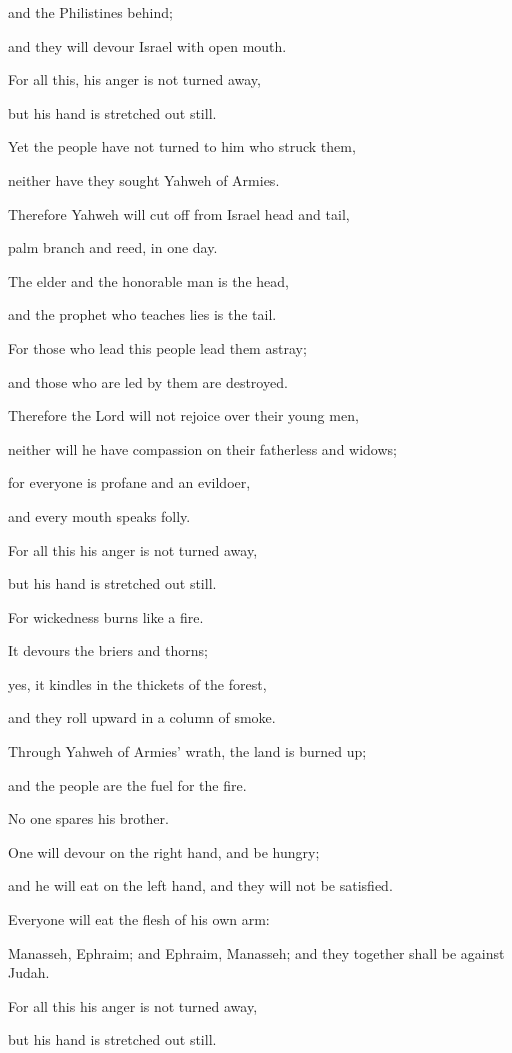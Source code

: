 {\par }{\QB and the Philistines behind;
\par }{\QB and they will devour Israel with open mouth.
\par }{\Q For all this, his anger is not turned away,
\par }{\QB but his hand is stretched out still.
\par }{\BB \par }{\Q {}Yet the people have not turned to him who struck them,
\par }{\QB neither have they sought Yahweh of Armies.
\par }{\Q {}Therefore Yahweh will cut off from Israel head and tail,
\par }{\QB palm branch and reed, in one day.
\par }{\Q {}The elder and the honorable man is the head,
\par }{\QB and the prophet who teaches lies is the tail.
\par }{\Q {}For those who lead this people lead them astray;
\par }{\QB and those who are led by them are destroyed.
\par }{\Q {}Therefore the Lord will not rejoice over their young men,
\par }{\QB neither will he have compassion on their fatherless and widows;
\par }{\Q for everyone is profane and an evildoer,
\par }{\QB and every mouth speaks folly.
\par }{\Q For all this his anger is not turned away,
\par }{\QB but his hand is stretched out still.
\par }{\BB \par }{\Q {}For wickedness burns like a fire.
\par }{\QB It devours the briers and thorns;
\par }{\QB yes, it kindles in the thickets of the forest,
\par }{\QB and they roll upward in a column of smoke.
\par }{\Q {}Through Yahweh of Armies’ wrath, the land is burned up;
\par }{\QB and the people are the fuel for the fire.
\par }{\QB No one spares his brother.
\par }{\Q {}One will devour on the right hand, and be hungry;
\par }{\QB and he will eat on the left hand, and they will not be satisfied.
\par }{\Q Everyone will eat the flesh of his own arm:
\par }{\QB {}Manasseh, Ephraim; and Ephraim, Manasseh; and they together shall be against Judah.
\par }{\Q For all this his anger is not turned away,
\par }{\QB but his hand is stretched out still.

}
